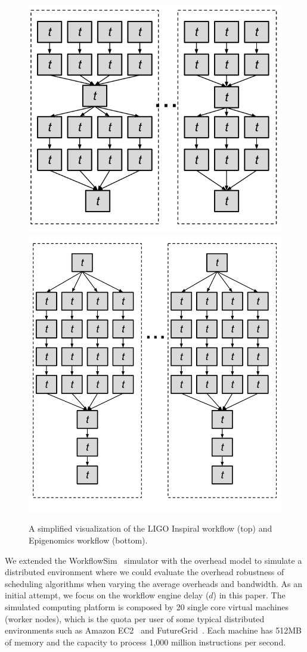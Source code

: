 \documentclass[final]{IEEEtran}
\begin{document}
\begin{figure}[htb]
	\centering
	\includegraphics[width=0.65\linewidth]{figure/shape_of_inspiral.png} \\
	\includegraphics[width=0.7\linewidth]{figure/shape_of_genome.png}
	\caption{A simplified visualization of the LIGO Inspiral workflow (top) and Epigenomics workflow (bottom).}
	\label{fig:shape}
	\vspace{-10pt}
\end{figure}

We extended the WorkflowSim~\cite{WorkflowSim} simulator with the overhead model to simulate a distributed environment where we could evaluate the overhead robustness of scheduling algorithms when varying the average overheads and bandwidth. As an initial attempt, we focus on the workflow engine delay ($d$) in this paper. The simulated computing platform is composed by 20 single core virtual machines (worker nodes), which is the quota per user of some typical distributed environments such as Amazon EC2~\cite{AmazonAWS} and FutureGrid~\cite{FutureGrid}. Each machine has 512MB of memory and the capacity to process 1,000 million instructions per second. 
\end{document}
